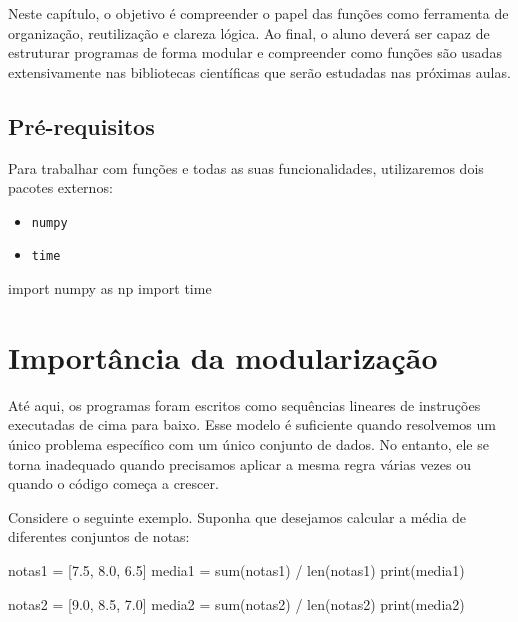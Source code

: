 \documentclass[
  brazilian,
  letterpaper,
  DIV=11,
  numbers=noendperiod]{scrreprt}
\newenvironment{Shaded}{\begin{snugshade}}{\end{snugshade}}
\newcommand{\BuiltInTok}[1]{\textcolor[rgb]{0.00,0.23,0.31}{#1}}
\newcommand{\FloatTok}[1]{\textcolor[rgb]{0.68,0.00,0.00}{#1}}
\newcommand{\ImportTok}[1]{\textcolor[rgb]{0.00,0.46,0.62}{#1}}
\newcommand{\NormalTok}[1]{\textcolor[rgb]{0.00,0.23,0.31}{#1}}
\newcommand{\OperatorTok}[1]{\textcolor[rgb]{0.37,0.37,0.37}{#1}}
\providecommand{\tightlist}{%
  \setlength{\itemsep}{0pt}\setlength{\parskip}{0pt}}
\begin{document}
Neste capítulo, o objetivo é compreender o papel das funções como
ferramenta de organização, reutilização e clareza lógica. Ao final, o
aluno deverá ser capaz de estruturar programas de forma modular e
compreender como funções são usadas extensivamente nas bibliotecas
científicas que serão estudadas nas próximas aulas.

\subsection{Pré-requisitos}\label{pruxe9-requisitos-5}

Para trabalhar com funções e todas as suas funcionalidades, utilizaremos
dois pacotes externos:

\begin{itemize}
\tightlist
\item
  \texttt{numpy}
\item
  \texttt{time}
\end{itemize}

\begin{Shaded}
\begin{Highlighting}[]
\ImportTok{import}\NormalTok{ numpy }\ImportTok{as}\NormalTok{ np}
\ImportTok{import}\NormalTok{ time}
\end{Highlighting}
\end{Shaded}

\section{Importância da
modularização}\label{importuxe2ncia-da-modularizauxe7uxe3o}

Até aqui, os programas foram escritos como sequências lineares de
instruções executadas de cima para baixo. Esse modelo é suficiente
quando resolvemos um único problema específico com um único conjunto de
dados. No entanto, ele se torna inadequado quando precisamos aplicar a
mesma regra várias vezes ou quando o código começa a crescer.

Considere o seguinte exemplo. Suponha que desejamos calcular a média de
diferentes conjuntos de notas:

\begin{Shaded}
\begin{Highlighting}[]
\NormalTok{notas1 }\OperatorTok{=}\NormalTok{ [}\FloatTok{7.5}\NormalTok{, }\FloatTok{8.0}\NormalTok{, }\FloatTok{6.5}\NormalTok{]}
\NormalTok{media1 }\OperatorTok{=} \BuiltInTok{sum}\NormalTok{(notas1) }\OperatorTok{/} \BuiltInTok{len}\NormalTok{(notas1)}
\BuiltInTok{print}\NormalTok{(media1)}

\NormalTok{notas2 }\OperatorTok{=}\NormalTok{ [}\FloatTok{9.0}\NormalTok{, }\FloatTok{8.5}\NormalTok{, }\FloatTok{7.0}\NormalTok{]}
\NormalTok{media2 }\OperatorTok{=} \BuiltInTok{sum}\NormalTok{(notas2) }\OperatorTok{/} \BuiltInTok{len}\NormalTok{(notas2)}
\BuiltInTok{print}\NormalTok{(media2)}
\end{Highlighting}
\end{Shaded}
\end{document}
